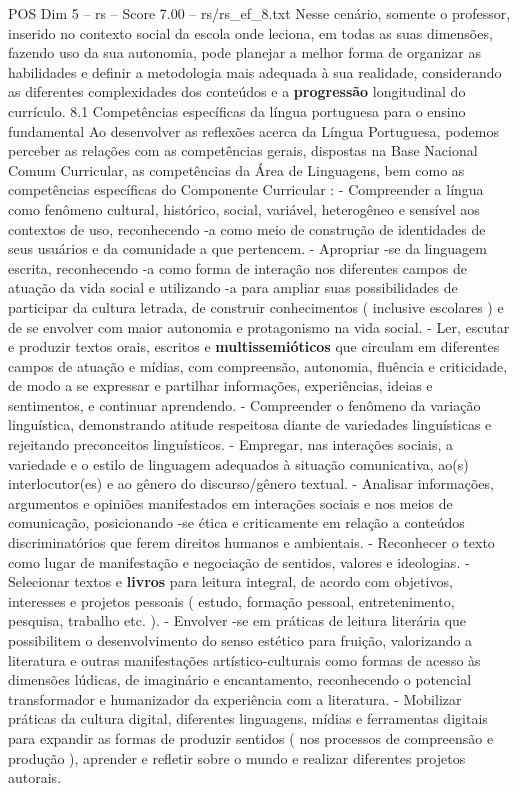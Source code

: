 \begin{textsample}{POS Dim 5 – rs – Score 7.00 – rs/rs\_ef\_8.txt}
Nesse cenário, somente o professor, inserido no contexto social da escola onde leciona, em todas as suas dimensões, fazendo uso da sua autonomia, pode planejar a melhor forma de organizar as habilidades e definir a metodologia mais adequada à sua realidade, considerando as diferentes complexidades dos conteúdos e a \textbf{progressão} longitudinal do currículo. 8.1 Competências específicas da língua portuguesa para o ensino fundamental Ao desenvolver as reflexões acerca da Língua Portuguesa, podemos perceber as relações com as competências gerais, dispostas na Base Nacional Comum Curricular, as competências da Área de Linguagens, bem como as competências específicas do Componente Curricular : - Compreender a língua como fenômeno cultural, histórico, social, variável, heterogêneo e sensível aos contextos de uso, reconhecendo -a como meio de construção de identidades de seus usuários e da comunidade a que pertencem. - Apropriar -se da linguagem escrita, reconhecendo -a como forma de interação nos diferentes campos de atuação da vida social e utilizando -a para ampliar suas possibilidades de participar da cultura letrada, de construir conhecimentos ( inclusive escolares ) e de se envolver com maior autonomia e protagonismo na vida social. - Ler, escutar e produzir textos orais, escritos e \textbf{multissemióticos} que circulam em diferentes campos de atuação e mídias, com compreensão, autonomia, fluência e criticidade, de modo a se expressar e partilhar informações, experiências, ideias e sentimentos, e continuar aprendendo. - Compreender o fenômeno da variação linguística, demonstrando atitude respeitosa diante de variedades linguísticas e rejeitando preconceitos linguísticos. - Empregar, nas interações sociais, a variedade e o estilo de linguagem adequados à situação comunicativa, ao(s) interlocutor(es) e ao gênero do discurso/gênero textual. - Analisar informações, argumentos e opiniões manifestados em interações sociais e nos meios de comunicação, posicionando -se ética e criticamente em relação a conteúdos discriminatórios que ferem direitos humanos e ambientais. - Reconhecer o texto como lugar de manifestação e negociação de sentidos, valores e ideologias. - Selecionar textos e \textbf{livros} para leitura integral, de acordo com objetivos, interesses e projetos pessoais ( estudo, formação pessoal, entretenimento, pesquisa, trabalho etc. ). - Envolver -se em práticas de leitura literária que possibilitem o desenvolvimento do senso estético para fruição, valorizando a literatura e outras manifestações artístico-culturais como formas de acesso às dimensões lúdicas, de imaginário e encantamento, reconhecendo o potencial transformador e humanizador da experiência com a literatura. - Mobilizar práticas da cultura digital, diferentes linguagens, mídias e ferramentas digitais para expandir as formas de produzir sentidos ( nos processos de compreensão e produção ), aprender e refletir sobre o mundo e realizar diferentes projetos autorais.

\end{textsample}
